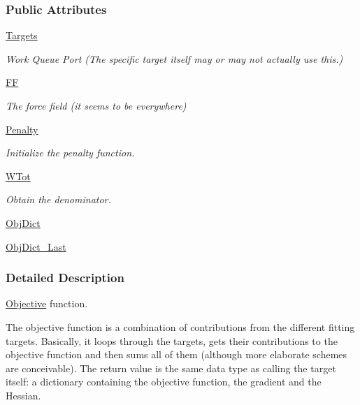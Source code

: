 \subsubsection*{Public Attributes}
\begin{DoxyCompactItemize}
\item 
\hyperlink{classsrc_1_1objective_1_1Objective_a13eee4f9a973a4126cf621a71cf9458d}{Targets}
\begin{DoxyCompactList}\small\item\em Work Queue Port (The specific target itself may or may not actually use this.) \end{DoxyCompactList}\item 
\hyperlink{classsrc_1_1objective_1_1Objective_ab20f8204a337e3f62cc812dfc74fecd0}{FF}
\begin{DoxyCompactList}\small\item\em The force field (it seems to be everywhere) \end{DoxyCompactList}\item 
\hyperlink{classsrc_1_1objective_1_1Objective_ad5ca5b9e6cc7d044db4ff26e02ae0ad3}{Penalty}
\begin{DoxyCompactList}\small\item\em Initialize the penalty function. \end{DoxyCompactList}\item 
\hyperlink{classsrc_1_1objective_1_1Objective_aa9804c666636ac4eb64869cf03ca5a19}{W\+Tot}
\begin{DoxyCompactList}\small\item\em Obtain the denominator. \end{DoxyCompactList}\item 
\hyperlink{classsrc_1_1objective_1_1Objective_a3a7e624a7c5a6cca8002a10deb6b624f}{Obj\+Dict}
\item 
\hyperlink{classsrc_1_1objective_1_1Objective_a8e1f80418dd2002b233cf74c9b6c3670}{Obj\+Dict\+\_\+\+Last}
\end{DoxyCompactItemize}


\subsubsection{Detailed Description}
\hyperlink{classsrc_1_1objective_1_1Objective}{Objective} function. 

The objective function is a combination of contributions from the different fitting targets. Basically, it loops through the targets, gets their contributions to the objective function and then sums all of them (although more elaborate schemes are conceivable). The return value is the same data type as calling the target itself\+: a dictionary containing the objective function, the gradient and the Hessian.

